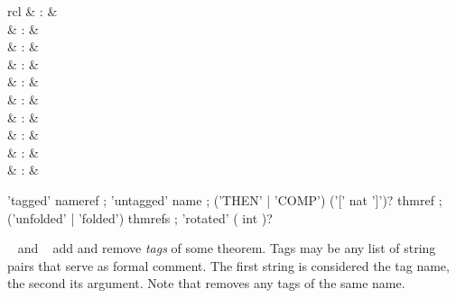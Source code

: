 \begin{isabellebody}
\begin{isamarkuptext}
  \begin{matharray}{rcl}
    \hypertarget{attribute.tagged}{\hyperlink{attribute.tagged}{\mbox{}}} & : & \isaratt \\
    \hypertarget{attribute.untagged}{\hyperlink{attribute.untagged}{\mbox{}}} & : & \isaratt \\[0.5ex]
    \hypertarget{attribute.THEN}{\hyperlink{attribute.THEN}{\mbox{}}} & : & \isaratt \\
    \hypertarget{attribute.COMP}{\hyperlink{attribute.COMP}{\mbox{}}} & : & \isaratt \\[0.5ex]
    \hypertarget{attribute.unfolded}{\hyperlink{attribute.unfolded}{\mbox{}}} & : & \isaratt \\
    \hypertarget{attribute.folded}{\hyperlink{attribute.folded}{\mbox{}}} & : & \isaratt \\[0.5ex]
    \hypertarget{attribute.rotated}{\hyperlink{attribute.rotated}{\mbox{}}} & : & \isaratt \\
    \hypertarget{attribute.Pure.elim-format}{\hyperlink{attribute.Pure.elim-format}{\mbox{}}} & : & \isaratt \\
    \hypertarget{attribute.standard}{\hyperlink{attribute.standard}{\mbox{}}}\isa{{\isachardoublequote}\isactrlsup {\isacharasterisk}{\isachardoublequote}} & : & \isaratt \\
    \hypertarget{attribute.no-vars}{\hyperlink{attribute.no-vars}{\mbox{}}}\isa{{\isachardoublequote}\isactrlsup {\isacharasterisk}{\isachardoublequote}} & : & \isaratt \\
  \end{matharray}

  \begin{rail}
    'tagged' nameref
    ;
    'untagged' name
    ;
    ('THEN' | 'COMP') ('[' nat ']')? thmref
    ;
    ('unfolded' | 'folded') thmrefs
    ;
    'rotated' ( int )?
  \end{rail}

  \begin{descr}

  \item [\hyperlink{attribute.tagged}{\mbox{\isa{tagged}}}~\isa{{\isachardoublequote}name\ arg{\isachardoublequote}} and \hyperlink{attribute.untagged}{\mbox{\isa{untagged}}}~\isa{name}] add and remove \emph{tags} of some theorem.
  Tags may be any list of string pairs that serve as formal comment.
  The first string is considered the tag name, the second its
  argument.  Note that \hyperlink{attribute.untagged}{\mbox{}} removes any tags of the
  same name.


\end{descr}
\end{isamarkuptext}
\end{isabellebody}
